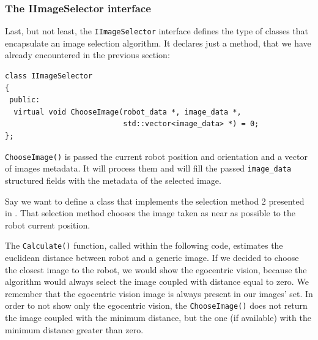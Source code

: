 %
\subsubsection{The IImageSelector interface}
\label{sub:iimageselector}

Last, but not least, the \texttt{IImageSelector} interface
defines the type of classes that encapsulate an image 
selection algorithm. It declares just a method, that 
we have already encountered in the previous section:
%
\begin{lstlisting}[caption={\texttt{IImageSelector} declaration}, label={code:iimageselector}, frame=trBL]
class IImageSelector
{
 public:
  virtual void ChooseImage(robot_data *, image_data *, 
                           std::vector<image_data> *) = 0;
};
\end{lstlisting}
%
\texttt{ChooseImage()} is passed the current robot position and
orientation and a vector of images metadata. It will process them 
and will fill the passed \texttt{image\_data} structured fields 
with the metadata of the selected image.
%

%
Say we want to define a class that implements the selection 
method 2 presented in \cite{sugimoto}. That selection method
chooses the image taken as near as possible to the robot
current position.
%

%
The \texttt{Calculate()} function, called within the following code,
estimates the euclidean distance between robot and a generic image.
If we decided to choose the closest image to the robot, we would
show the egocentric vision, because the algorithm would always
select the image coupled with distance equal to zero. We remember
that the egocentric vision image is always present in our images' set.
%
In order to not show only the egocentric vision, the \texttt{ChooseImage()}
does not return the image coupled with the minimum distance, but the one
(if available) with the minimum distance greater than zero.
%

